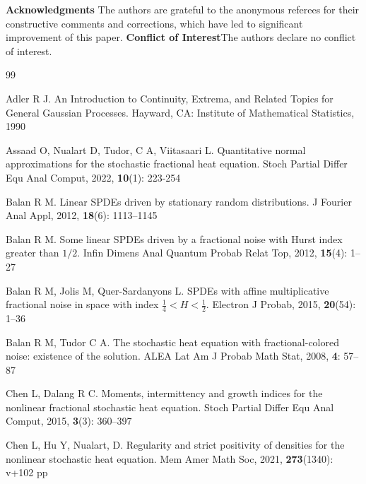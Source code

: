 \documentclass[11pt,reqno]{amsart}
\numberwithin{equation}{section}
\newcommand{\1}{{\bf 1}}
\newcommand{\2}{{\bf 2}}
\begin{document}
\vskip 0.5cm
{\bf Acknowledgments} \quad The authors are grateful to the anonymous referees for their constructive comments and corrections, which have led to significant improvement of this paper.  
\vskip 0.5cm
{\bf Conflict of Interest}\quad The authors declare no conflict of interest.



\vskip 0.5cm
\begin{thebibliography}{99}

 


Adler R J.
An Introduction to Continuity, Extrema, and Related Topics for General Gaussian Processes.
Hayward, CA: Institute of Mathematical Statistics, 1990


Assaad O, Nualart D, Tudor, C A, Viitasaari L.
Quantitative normal approximations for the stochastic fractional heat equation.
Stoch Partial Differ Equ Anal Comput, 2022, {\bf 10}(1): 223-254




Balan R M.
Linear SPDEs driven by stationary random distributions.
J Fourier Anal Appl, 2012, {\bf 18}(6): 1113--1145





Balan R M.
Some linear SPDEs driven by a fractional noise with Hurst index greater than $1/2$.
Infin Dimens Anal Quantum Probab Relat Top, 2012, {\bf 15}(4): 1--27




Balan R M, Jolis M, Quer-Sardanyons L.
SPDEs with affine multiplicative fractional noise in space with index $\frac 14<H<\frac 12$.
Electron J Probab, 2015, {\bf 20}(54): 1--36



Balan R M, Tudor C A.
The stochastic heat equation with fractional-colored noise: existence of the solution.
ALEA Lat Am J Probab Math Stat, 2008, {\bf 4}: 57--87



Chen L, Dalang R C.
Moments, intermittency and growth indices for the nonlinear fractional stochastic heat equation.
Stoch Partial Differ Equ Anal Comput, 2015, {\bf 3}(3): 360--397







Chen L, Hu Y, Nualart, D.
Regularity and strict positivity of densities for the nonlinear stochastic heat equation.
Mem Amer Math Soc, 2021, {\bf 273}(1340): v+102 pp





\end{thebibliography}
\end{document}

